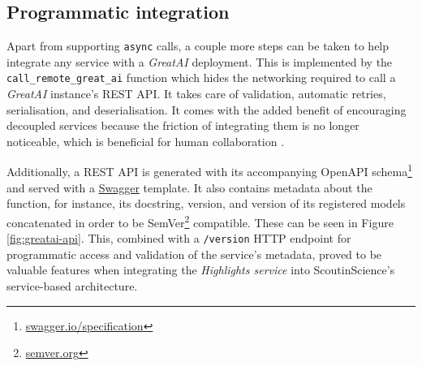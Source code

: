 \subsection{Programmatic integration}

Apart from supporting \texttt{async} calls, a couple more steps can be taken to help integrate any service with a \textit{GreatAI} deployment. This is implemented by the \texttt{call\_remote\_great\_ai} function which hides the networking required to call a \textit{GreatAI} instance's REST API. It takes care of validation, automatic retries, serialisation, and deserialisation. It comes with the added benefit of encouraging decoupled services because the friction of integrating them is no longer noticeable, which is beneficial for human collaboration \cite{hasselbring2002component}.

Additionally, a REST API is generated with its accompanying OpenAPI schema\footnote{\href{https://swagger.io/specification}{swagger.io/specification}} and served with a \href{https://swagger.io/}{Swagger} template. It also contains metadata about the function, for instance, its docstring, version, and version of its registered models concatenated in order to be SemVer\footnote{\href{https://semver.org/}{semver.org}} compatible. These can be seen in Figure \ref{fig:greatai-api}. This, combined with a \texttt{/version} HTTP endpoint for programmatic access and validation of the service's metadata, proved to be valuable features when integrating the \textit{Highlights service} into ScoutinScience's service-based architecture.

